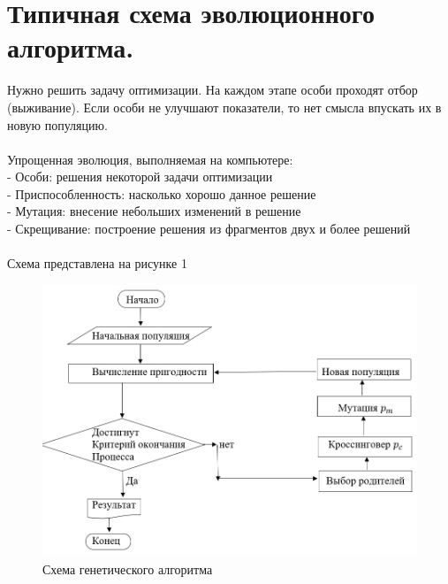 \section{Типичная схема эволюционного алгоритма.}
\begin{itemize}
     Нужно решить задачу оптимизации. На каждом этапе особи проходят отбор (выживание). Если особи не улучшают показатели, то  нет смысла впускать их в новую популяцию.  \\
     \\
Упрощенная эволюция, выполняемая на компьютере:\\
- Особи: решения некоторой задачи оптимизации \\
- Приспособленность: насколько хорошо данное решение\\
- Мутация: внесение небольших изменений в решение\\
- Скрещивание: построение решения из фрагментов двух и более решений\\
\\
Схема представлена на рисунке 1
\end{itemize}
\begin{figure}[h]
\centering
\includegraphics[width=0.8\linewidth]{images/Sxema.jpg}
\caption{Схема генетического алгоритма}
\label{fig:mpr}
\end{figure}
